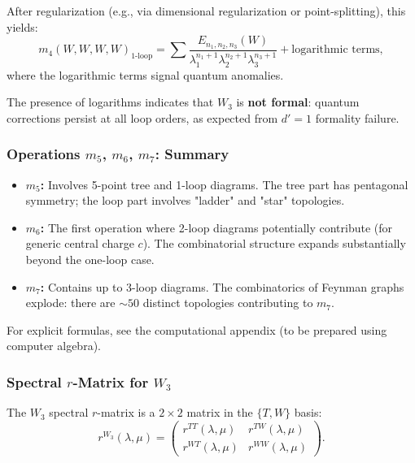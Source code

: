After regularization (e.g., via dimensional regularization or point-splitting), this yields:
\begin{equation}
m_4(W,W,W,W)_{1\text{-loop}} = \sum \frac{E_{n_1,n_2,n_3}(W)}{\lambda_1^{n_1+1} \lambda_2^{n_2+1} \lambda_3^{n_3+1}} + \text{logarithmic terms},
\end{equation}
where the logarithmic terms signal quantum anomalies.

\begin{remark}
The presence of logarithms indicates that $W_3$ is \textbf{not formal}: quantum corrections persist at all loop orders, as expected from $d'=1$ formality failure.
\end{remark}

\subsubsection{Operations $m_5$, $m_6$, $m_7$: Summary}

\begin{itemize}
\item \textbf{$m_5$:} Involves 5-point tree and 1-loop diagrams. The tree part has pentagonal symmetry; the loop part involves "ladder" and "star" topologies.

\item \textbf{$m_6$:} The first operation where 2-loop diagrams potentially contribute (for generic central charge $c$). The combinatorial structure expands substantially beyond the one-loop case.

\item \textbf{$m_7$:} Contains up to 3-loop diagrams. The combinatorics of Feynman graphs explode: there are $\sim 50$ distinct topologies contributing to $m_7$.
\end{itemize}

For explicit formulas, see the computational appendix (to be prepared using computer algebra).

\subsubsection{Spectral $r$-Matrix for $W_3$}

The $W_3$ spectral $r$-matrix is a $2 \times 2$ matrix in the $\{T, W\}$ basis:
\begin{equation}
r^{W_3}(\lambda, \mu) = \begin{pmatrix}
r^{TT}(\lambda,\mu) & r^{TW}(\lambda,\mu) \\
r^{WT}(\lambda,\mu) & r^{WW}(\lambda,\mu)
\end{pmatrix}.
\end{equation}

